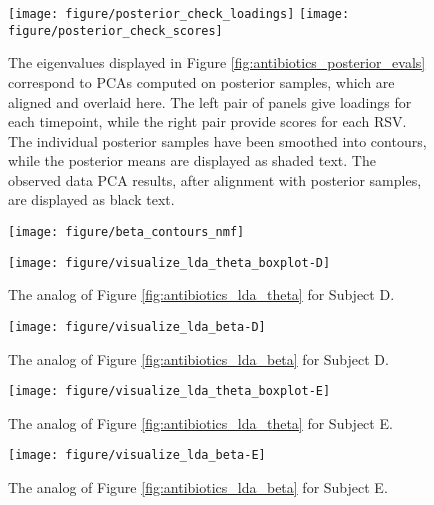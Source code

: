 \documentclass[oupdraft]{bio}
\begin{document}
\begin{figure}[!p]
  \centering
  \texttt{[image: figure/posterior\_check\_loadings]}
  \texttt{[image: figure/posterior\_check\_scores]}
  \caption{The eigenvalues displayed in Figure
    \ref{fig:antibiotics_posterior_evals} correspond to PCAs computed on
    posterior samples, which are aligned and overlaid here. The left pair of
    panels give loadings for each timepoint, while the right pair provide scores
    for each RSV. The individual posterior samples have been smoothed into
    contours, while the posterior means are displayed as shaded text. The
    observed data PCA results, after alignment with posterior samples, are
    displayed as black text. \label{fig:antibiotics_posterior_pca} }
\end{figure}

\begin{figure}[!p]
  \centering
  \texttt{[image: figure/beta\_contours\_nmf]}
  \caption{\label{fig:zinf_contours} }
\end{figure}

\begin{figure}[!p]
  \centering\texttt{[image: figure/visualize\_lda\_theta\_boxplot-D]}
  \caption{The analog of Figure \ref{fig:antibiotics_lda_theta} for Subject D.}
\end{figure}

\begin{figure}[!p]
  \centering\texttt{[image: figure/visualize\_lda\_beta-D]}
  \caption{The analog of Figure \ref{fig:antibiotics_lda_beta} for Subject D.}
\end{figure}

\begin{figure}[!p]
  \centering\texttt{[image: figure/visualize\_lda\_theta\_boxplot-E]}
  \caption{The analog of Figure \ref{fig:antibiotics_lda_theta} for Subject E.}
\end{figure}

\begin{figure}[!p]
  \centering\texttt{[image: figure/visualize\_lda\_beta-E]}
  \caption{The analog of Figure \ref{fig:antibiotics_lda_beta} for Subject E.}
\end{figure}
\end{document}
